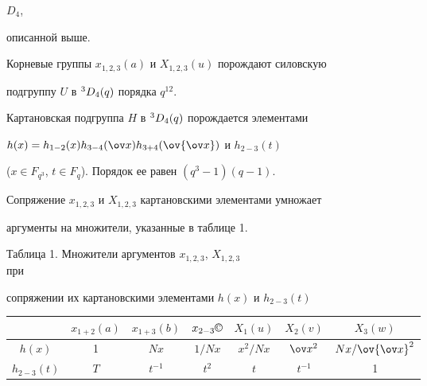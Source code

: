 $D_4$,  


описанной выше. 


Корневые группы $x_{1,2,3}(a)$ и $X_{1,2,3}(u)$ порождают силовскую  


подгруппу $U$ в ${}^3D_4(q)$ порядка $q^{12}$. 


Картановская подгруппа $H$ в ${}^3D_4(q)$ порождается элементами 


$h(x)=h_{1-2}(x)h_{3-4}(\ov x)h_{3+4}(\ov{\ov x})$ и $h_{2-3}(t)$ 


($x\in F_{q^3}$, $t\in F_q$). Порядок ее равен $(q^3-1)(q-1)$. 


 


Сопряжение $x_{1,2,3}$ и $X_{1,2,3}$ картановскими элементами умножает  


аргументы на множители, указанные в таблице 1. 


 


\begin{center} 


Таблица 1. Множители аргументов $x_{1,2,3}$, $X_{1,2,3}$\\ при 


сопряжении их картановскими элементами $h(x)$ и $h_{2-3}(t)$ 


\end{center} 


\begin{center} 


\begin{tabular}{|c|c|c|c|c|c|c|} 


\hline 


\ & $x_{1+2}(a)$ & $x_{1+3}(b)$ & $x_{2-3}\text{\copyright}$ & 


$X_1(u)$ & $X_2(v)$ & $X_3(w)$ \\ 


\hline 


$h(x)$ & 1 & $Nx$ & $1/Nx$ & $x^2/Nx$ & $\ov x^2$ 


& $Nx/\ov{\ov x}^2$ \\ 


\hline 


$h_{2-3}(t)$ & $T$ & $t^{-1}$ & $t^2$ & $t$ & $t^{-1}$ & 1 \\ 


\hline 


\end{tabular} 


\end{center} 


